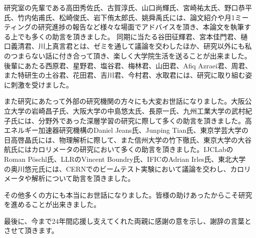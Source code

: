 研究室の先輩である高田秀佐氏、古賀淳氏、山口尚輝氏、宮崎祐太氏、野口恭平氏、竹内佑甫氏、松崎俊氏、岩下侑太郎氏、姚舜禹氏には、論文紹介や月1ミーティングの研究進捗の報告など様々な場面でアドバイスを頂き、本論文を執筆する上でも多くの助言を頂きました。
同期に当たる谷田征輝君、宮本佳門君、樋口義清君、川上真言君とは、ゼミを通して議論を交わしたほか、研究以外にも私のつまらない話に付き合って頂き、楽しく大学院生活を送ることが出来ました。
後輩にあたる西原君、星野君、塩谷君、梅林君、山田君、Afiq Azraei君、周君、また特研生の土谷君、花田君、吉川君、今村君、水取君には、研究に取り組む姿に刺激を受けました。

また研究にあたって外部の研究機関の方々にも大変お世話になりました。大阪公立大学の岩崎昌子氏、大阪大学の中島悠太氏、長原一氏、九州工業大学の武村紀子氏には、分野外であった深層学習の研究に際して多くの助言を頂きました。高エネルギー加速器研究機構のDaniel Jeans氏、Junping Tian氏、東京学芸大学の日高啓晶氏には、物理解析に際して、また信州大学の竹下徹氏、東京大学の大谷航氏にはカロリメータの研究において多くの助言を頂きました。IJCLabのRoman P\"{o}schl氏、LLRのVincent Boundry氏、IFICのAdrian Irles氏、東北大学の奥川悠元氏には、CERNでのビームテスト実験において議論を交わし、カロリメータや解析について助言を頂きました。

その他多くの方にも本当にお世話になりました。皆様の助けあったからこそ研究を進めることが出来きました。

最後に、今まで24年間応援し支えてくれた両親に感謝の意を示し、謝辞の言葉とさせて頂きます。